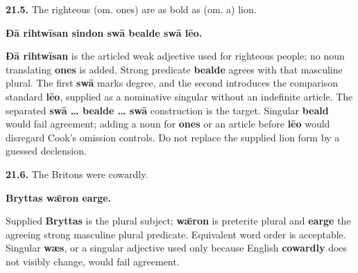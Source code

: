 \par\begin{minipage}{\linewidth}\raggedright
\textbf{21.5.} The righteous (om. ones) are as bold as (om. a) lion.

\textbf{Ðā rihtwīsan sindon swā bealde swā lēo.}

\textbf{Ðā rihtwīsan} is the articled weak adjective used for righteous people; no noun translating \textbf{ones} is added. Strong predicate \textbf{bealde} agrees with that masculine plural. The first \textbf{swā} marks degree, and the second introduces the comparison standard \textbf{lēo}, supplied as a nominative singular without an indefinite article. The separated \textbf{swā … bealde … swā} construction is the target. Singular \textbf{beald} would fail agreement; adding a noun for \textbf{ones} or an article before \textbf{lēo} would disregard Cook's omission controls. Do not replace the supplied lion form by a guessed declension.

\end{minipage}\par\addvspace{4pt}

\par\begin{minipage}{\linewidth}\raggedright
\textbf{21.6.} The Britons were cowardly.

\textbf{Bryttas wǣron earge.}

Supplied \textbf{Bryttas} is the plural subject; \textbf{wǣron} is preterite plural and \textbf{earge} the agreeing strong masculine plural predicate. Equivalent word order is acceptable. Singular \textbf{wæs}, or a singular adjective used only because English \textbf{cowardly} does not visibly change, would fail agreement.

\end{minipage}\par\addvspace{4pt}

